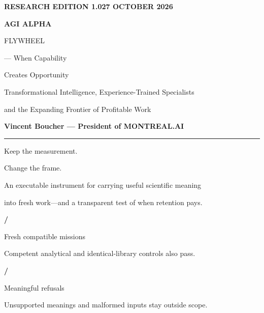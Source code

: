 \documentclass[10pt,a4paper]{article}
\begin{document}
\begin{titlepage}
\pagecolor{cream}
\thispagestyle{empty}
{\sffamily\small\bfseries\color{teal}RESEARCH EDITION 1.0\hfill 27 OCTOBER 2026}\par
\vspace{22mm}
{\sffamily\fontsize{36}{40}\selectfont\bfseries AGI ALPHA\par FLYWHEEL}\par
\vspace{5mm}
{\fontsize{26}{31}\selectfont — When Capability\par Creates Opportunity}\par
\vspace{9mm}
{\sffamily\fontsize{14}{19}\selectfont Transformational Intelligence, Experience-Trained Specialists\par and the Expanding Frontier of Profitable Work}\par
\vspace{8mm}
{\sffamily\fontsize{12}{16}\selectfont\bfseries Vincent Boucher — President of MONTREAL.AI}\par
\vspace{11mm}
{\color{gold}\rule{35mm}{1.2pt}}\par
\vspace{4mm}
{\fontsize{17}{22}\selectfont Keep the measurement.\par Change the frame.}\par
\vspace{4mm}
{\large An executable instrument for carrying useful scientific meaning\par into fresh work—and a transparent test of when retention pays.}\par
\vfill
\begin{minipage}[t]{0.31\textwidth}\raggedright
{\sffamily\fontsize{24}{26}\selectfont\bfseries\color{teal}\FreshPass/\FreshTotal}\par
{\sffamily\small Fresh compatible missions}\par
{\footnotesize Competent analytical and identical-library controls also pass.}
\end{minipage}\hfill
\begin{minipage}[t]{0.31\textwidth}\raggedright
{\sffamily\fontsize{24}{26}\selectfont\bfseries\color{teal}\RefusalPass/\RefusalTotal}\par
{\sffamily\small Meaningful refusals}\par
{\footnotesize Unsupported meanings and malformed inputs stay outside scope.}
\end{minipage}\hfill

\end{titlepage}
\end{document}
